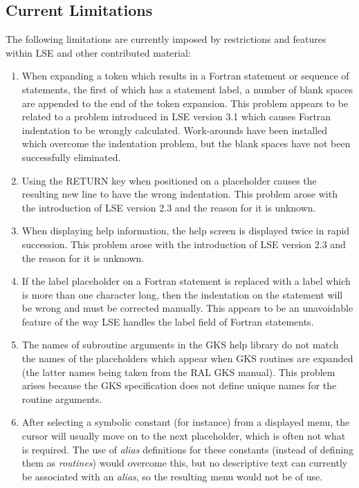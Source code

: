 
\subsection{Current Limitations}

The following limitations are currently imposed by restrictions and features 
within \mbox{LSE} and other contributed material:

\begin{enumerate}

\item When expanding a token which results in a Fortran statement or sequence of
statements, the first of which has a statement label, a number of blank spaces
are appended to the end of the token expansion.  This problem appears to be
related to a problem introduced in LSE version 3.1 which causes Fortran
indentation to be wrongly calculated.  Work-arounds have been installed which
overcome the indentation problem, but the blank spaces have not been
successfully eliminated. 

\item Using the RETURN key when positioned on a placeholder causes the
resulting new line to have the wrong indentation.
This problem arose with the introduction of LSE version 2.3 and the reason for
it is unknown. 

\item When displaying help information, the help screen is displayed twice 
in rapid succession.
This problem arose with the introduction of LSE version 2.3 and the reason for
it is unknown. 

\item If the label placeholder on a Fortran statement is replaced with a
label which is more than one character long, then the indentation on the
statement will be wrong and must be corrected manually.
This appears to be an unavoidable feature of the way LSE handles the label 
field of Fortran statements.

\item The names of subroutine arguments in the \mbox{GKS} help library do
not match the names of the placeholders which appear when \mbox{GKS}
routines are expanded (the latter names being taken from the \mbox{RAL}
\mbox{GKS} manual). 
This problem arises because the GKS specification does not define unique 
names for the routine arguments.

\item After selecting a symbolic constant (for instance) from a displayed
menu, the cursor will usually move on to the next placeholder, which is
often not what is required. 
The use of {\em alias} definitions for these constants (instead of defining
them as {\em routines}) would overcome this, but no descriptive text can
currently be associated with an {\em alias}, so the resulting menu would not
be of use. 

\end{enumerate}



